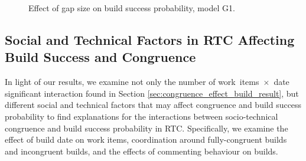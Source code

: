 \begin{figure}[t]
\begin{minipage}[b]{0.4\linewidth}
	\caption{Effect of gap size on build success probability, model G1. }
	\label{fig:prob_gapsize_a}
\end{minipage}
\end{figure}




\subsection{Social and Technical Factors in RTC Affecting Build Success and Congruence}
\label{sec:otherfactors}

In light of our results, we examine not only the number of work~items~$\times$~date significant interaction found in Section \ref{sec:congruence_effect_build_result}, but different social and technical factors that may affect congruence
and build success probability to find explanations for the interactions between socio-technical congruence and build success probability in RTC.
Specifically, we examine the effect of build date on work items, coordination around fully-congruent builds and
incongruent builds, and the effects of commenting behaviour on builds.

%

%



